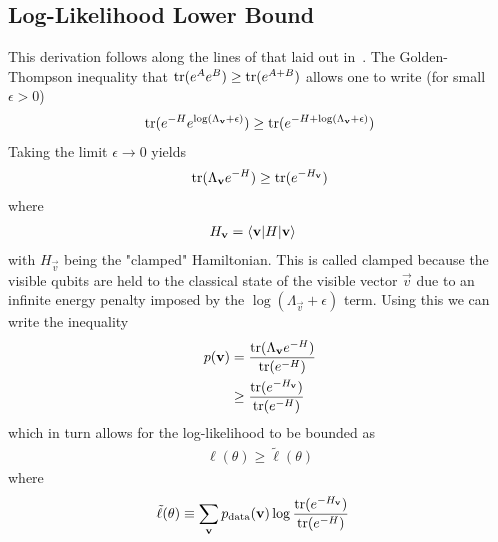 \subsection{Log-Likelihood Lower Bound}\label{app:qbm_log_likelihood_lower_bound}
This derivation follows along the lines of that laid out in~\cite{amin_2018}.
The Golden-Thompson inequality that \( \text{tr}(e^{A}e^{B}) \ge \text{tr}(e^{A+B}) \) allows one to write (for small \( \epsilon > 0 \))
\begin{align}
    \text{tr}(e^{-H} e^{\log(\Lambda_{\mathbf{v}}+\epsilon)}) \ge \text{tr}(e^{-H+\log(\Lambda_{\mathbf{v}}+\epsilon)})
\end{align}
Taking the limit \( \epsilon \rightarrow 0 \) yields
\begin{align}
    \text{tr}(\Lambda_{\mathbf{v}}e^{-H}) \ge \text{tr}(e^{-H_{\mathbf{v}}})
\end{align}
where
\begin{align}
    H_{\mathbf{v}} &= \braket{\mathbf{v} | H | \mathbf{v}}
\end{align}
with \( H_\vec{v} \) being the "clamped" Hamiltonian.
This is called clamped because the visible qubits are held to the classical state of the visible vector \( \vec{v} \) due to an infinite energy penalty imposed by the \( \log(\Lambda_\vec{v} + \epsilon) \) term.
Using this we can write the inequality
\begin{align}
\begin{split}
    p(\mathbf{v})
        &= \frac{\text{tr}(\Lambda_{\mathbf{v}} e^{-H})}{\text{tr}(e^{-H})} \\
        &\ge \frac{\text{tr}(e^{-H_{\mathbf{v}}})}{\text{tr}(e^{-H})}
\end{split}
\end{align}
which in turn allows for the log-likelihood to be bounded as
\begin{align}
    \ell(\theta) \ge \tilde{\ell}(\theta)
\end{align}
where
\begin{align}
    \tilde{\ell}(\theta)
        &\equiv \sum_{\mathbf{v}} p_\text{data}(\mathbf{v}) \log\frac{\text{tr}(e^{-H_{\mathbf{v}}})}{\text{tr}(e^{-H})}
\end{align}
